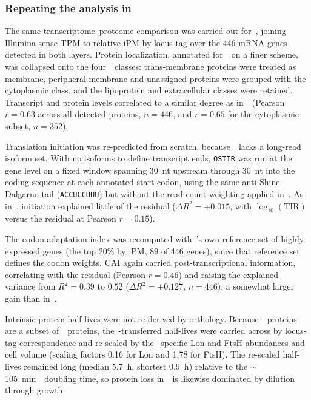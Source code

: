 \subsubsection{Repeating the analysis in \syna}

The same transcriptome--proteome comparison was carried out for~\syna, joining Illumina sense TPM to relative iPM by locus tag over the 446 mRNA genes detected in both layers.
Protein localization, annotated for~\syna~on a finer scheme, was collapsed onto the four~\syn~classes: trans-membrane proteins were treated as membrane, peripheral-membrane and unassigned proteins were grouped with the cytoplasmic class, and the lipoprotein and extracellular classes were retained.
Transcript and protein levels correlated to a similar degree as in~\syn~(Pearson $r = 0.63$ across all detected proteins, $n = 446$, and $r = 0.65$ for the cytoplasmic subset, $n = 352$).

Translation initiation was re-predicted from scratch, because~\syna~lacks a long-read isoform set.
With no isoforms to define transcript ends, \texttt{OSTIR} was run at the gene level on a fixed window spanning 30~nt upstream through 30~nt into the coding sequence at each annotated start codon, using the same anti-Shine--Dalgarno tail (\texttt{ACCUCCUUU}) but without the read-count weighting applied in~\syn.
As in~\syn, initiation explained little of the residual ($\Delta R^{2} = +0.015$, with $\log_{10}(\text{TIR})$ versus the residual at Pearson $r = 0.15$).

The codon adaptation index was recomputed with~\syna's own reference set of highly expressed genes (the top 20\% by iPM, 89 of 446 genes), since that reference set defines the codon weights.
CAI again carried post-transcriptional information, correlating with the residual (Pearson $r = 0.46$) and raising the explained variance from $R^{2} = 0.39$ to $0.52$ ($\Delta R^{2} = +0.127$, $n = 446$), a somewhat larger gain than in~\syn.

Intrinsic protein half-lives were not re-derived by orthology.
Because~\syna~proteins are a subset of~\syn~proteins, the~\mpn-transferred half-lives were carried across by locus-tag correspondence and re-scaled by the~\syna-specific Lon and FtsH abundances and cell volume (scaling factors 0.16 for Lon and 1.78 for FtsH).
The re-scaled half-lives remained long (median 5.7~h, shortest 0.9~h) relative to the $\sim$105~min~\syna~doubling time, so protein loss in~\syna~is likewise dominated by dilution through growth.